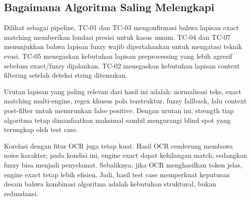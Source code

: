 \subsection{Bagaimana Algoritma Saling Melengkapi}
Dilihat sebagai pipeline, TC-01 dan TC-03 mengonfirmasi bahwa lapisan exact matching memberikan fondasi presisi untuk kasus umum. TC-04 dan TC-07 menunjukkan bahwa lapisan fuzzy wajib dipertahankan untuk mengatasi teknik evasi. TC-05 menegaskan kebutuhan lapisan preprocessing yang lebih agresif sebelum exact/fuzzy dijalankan. TC-02 menegaskan kebutuhan lapisan context filtering setelah deteksi string ditemukan.

Urutan lapisan yang paling relevan dari hasil ini adalah: normalisasi teks, exact matching multi-engine, regex khusus pola terstruktur, fuzzy fallback, lalu context post-filter untuk menurunkan false positive. Dengan urutan ini, strength tiap algoritma tetap dimanfaatkan maksimal sambil mengurangi blind spot yang terungkap oleh test case.

Korelasi dengan fitur OCR juga tetap kuat. Hasil OCR cenderung membawa noise karakter; pada kondisi ini, engine exact dapat kehilangan match, sedangkan fuzzy bisa menjadi penyelamat. Sebaliknya, jika OCR menghasilkan token jelas, engine exact tetap lebih efisien. Jadi, hasil test case memperkuat keputusan desain bahwa kombinasi algoritma adalah kebutuhan struktural, bukan redundansi.
